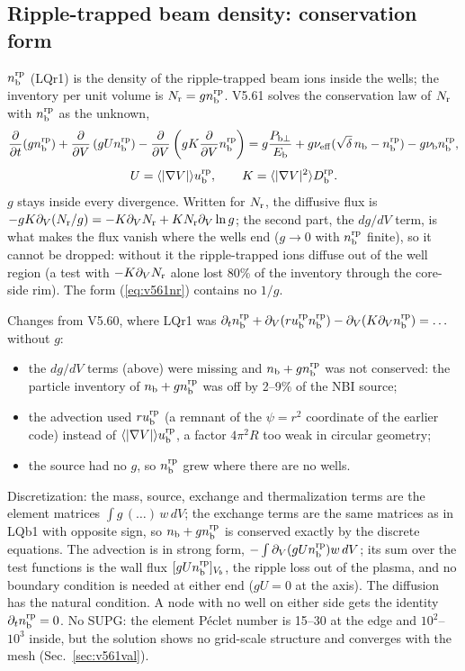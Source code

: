 \documentclass[11pt]{article}
\def\r#1{{\rm#1}}
\def\aves#1{\langle#1\rangle}
\def\ddV{\frac{\partial}{\partial V}}
\def\ddt{\frac{\partial}{\partial t}}
\def\nb{n_\r{b}}
\def\nbrp{n_\r{b}^\r{rp}}
\def\ubrp{u_\r{b}^\r{rp}}
\def\Dbrp{D_\r{b}^\r{rp}}
\def\Pbperp{P_{\r{b}\perp}}
\def\Eb{E_\r{b}}
\def\nueff{\nu_\r{eff}}
\def\nub{\nu_\r{b}}
\begin{document}
\subsection{Ripple-trapped beam density: conservation form}

$\nbrp$ (LQr1) is the density of the ripple-trapped beam ions inside the wells;
the inventory per unit volume is $N_\r{r} = g\nbrp$.  V5.61 solves the
conservation law of $N_\r{r}$ with $\nbrp$ as the unknown,
\begin{equation}
  \ddt(g\nbrp) + \ddV\left(g U \nbrp\right) - \ddV\left(g K \ddV\nbrp\right)
  = g\frac{\Pbperp}{\Eb} + g\nueff(\sqrt\delta\,\nb - \nbrp) - g\nub\nbrp ,
  \label{eq:v561nr}
\end{equation}
\begin{equation}
  U = \aves{|\nabla V|}\ubrp, \qquad K = \aves{|\nabla V|^2}\Dbrp .
\end{equation}
$g$ stays inside every divergence.  Written for $N_\r{r}$, the diffusive flux is
$-gK\partial_V(N_\r{r}/g) = -K\partial_V N_\r{r} + K N_\r{r}\partial_V\ln g$; the
second part, the $dg/dV$ term, is what makes the flux vanish where the wells end
($g\to0$ with $\nbrp$ finite), so it cannot be dropped: without it the
ripple-trapped ions diffuse out of the well region (a test with
$-K\partial_V N_\r{r}$ alone lost 80\% of the inventory through the core-side rim).
The form (\ref{eq:v561nr}) contains no $1/g$.

Changes from V5.60, where LQr1 was $\partial_t\nbrp + \partial_V(r\ubrp\nbrp) - \partial_V(K\partial_V\nbrp) = \ldots$
without $g$:
\begin{itemize}
\item the $dg/dV$ terms (above) were missing and $\nb + g\nbrp$ was not conserved:
  the particle inventory of $\nb + g\nbrp$ was off by 2--9\% of the NBI source;
\item the advection used $r\ubrp$ (a remnant of the $\psi = r^2$ coordinate of the
  earlier code) instead of $\aves{|\nabla V|}\ubrp$, a factor $4\pi^2R$ too weak in
  circular geometry;
\item the source had no $g$, so $\nbrp$ grew where there are no wells.
\end{itemize}
Discretization: the mass, source, exchange and thermalization terms are the
element matrices $\int g\,(\ldots)\,w\,dV$; the exchange terms are the same matrices
as in LQb1 with opposite sign, so $\nb + g\nbrp$ is conserved exactly by the
discrete equations.  The advection is in strong form, $-\int\partial_V(gU\nbrp)w\,dV$;
its sum over the test functions is the wall flux $[gU\nbrp]_{V_b}$, the ripple loss
out of the plasma, and no boundary condition is needed at either end ($gU = 0$ at
the axis).  The diffusion has the natural condition.  A node with no well on
either side gets the identity $\partial_t\nbrp = 0$.  No SUPG: the element P\'eclet
number is 15--30 at the edge and $10^2$--$10^3$ inside, but the solution shows no
grid-scale structure and converges with the mesh (Sec.~\ref{sec:v561val}).
\end{document}
